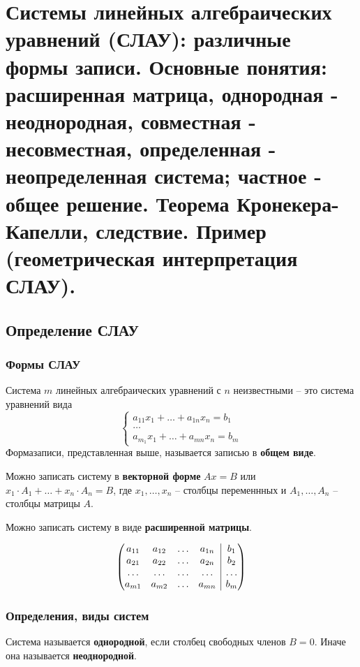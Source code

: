 \documentclass{article}
\begin{document}
\newpage
\section{Системы линейных алгебраических уравнений (СЛАУ): различные формы записи. Основные понятия: расширенная матрица, однородная - неоднородная, совместная - несовместная, определенная - неопределенная система; частное - общее решение. Теорема Кронекера-Капелли, следствие. Пример (геометрическая интерпретация СЛАУ).}
\subsection{Определение СЛАУ}
\subsubsection{Формы СЛАУ}
Система $m$ линейных алгебраических уравнений с $n$ неизвестными -- это система уравнений вида
\[
\begin{cases}
a_{11}x_1+\ldots+a_{1n}x_n=b_1 \\
\ldots \\
a_{m_1}x_1+\ldots+a_{mn}x_n=b_m
\end{cases}
\]
Формазаписи, представленная выше, называется записью в \textbf{общем виде}.

Можно записать систему в \textbf{векторной форме} $Ax=B$ или $x_1\cdot A_1+\ldots+x_n\cdot A_n=B$, где $x_1,\ldots,x_n$ -- столбцы переменнных и $A_1,\ldots,A_n$ -- столбцы матрицы $A$. 

Можно записать систему в виде \textbf{расширенной матрицы}.

\[
\left( \begin{array}{@{}c|c@{}}
   \begin{matrix}
      a_{11} & a_{12} & \ldots & a_{1n} \\
      a_{21} & a_{22} & \ldots & a_{2n} \\
      \ldots & \ldots & \ldots & \ldots \\
      a_{m1} & a_{m2} & \ldots & a_{mn}
   \end{matrix} 
   &
   \begin{matrix}
      b_1 \\
      b_2 \\
      \ldots \\
      b_m 
      \end{matrix} 
    \end{array} \right)
\]

\subsubsection{Определения, виды систем}
Система называется \textbf{однородной}, если столбец свободных членов $B = 0$. Иначе она называется \textbf{неоднородной}.
\end{document}
